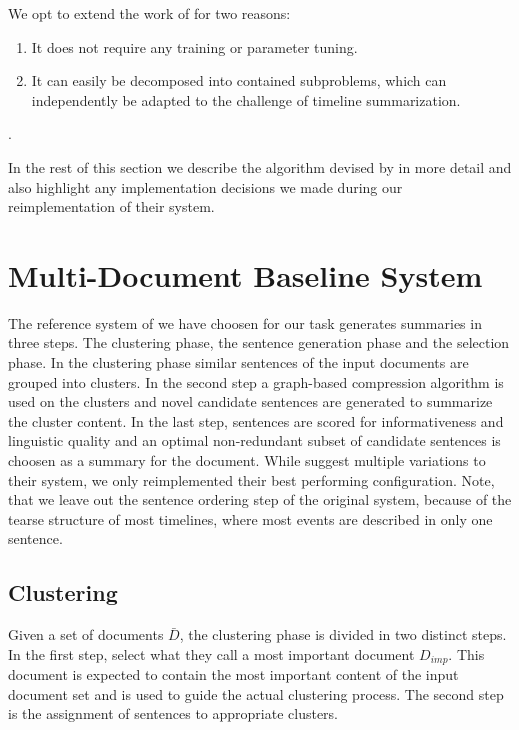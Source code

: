 \documentclass[a4paper,BCOR=10mm]{report}
\numberwithin{lemma}{chapter}
\numberwithin{definition}{chapter}
\begin{document}
We opt to extend the work of \citep{banerjee} for two reasons:

\begin{enumerate}
\item{It does not require any training or parameter tuning.}
\item{It can easily be decomposed into contained subproblems, which can independently be adapted to the challenge of timeline summarization.}
\end{enumerate}.

In the rest of this section we describe the algorithm devised by \citet{banerjee} in more detail and also highlight any implementation decisions we made during our reimplementation of their system.

\section{Multi-Document Baseline System} \label{sec:mds-baseline}

The reference system of \citet{banerjee} we have choosen for our task generates summaries in three steps. The clustering phase, the sentence generation phase and the selection phase. In the clustering phase similar sentences of the input documents are grouped into clusters. In the second step a graph-based compression algorithm is used on the clusters and novel candidate sentences are generated to summarize the cluster content. In the last step, sentences are scored for informativeness and linguistic quality and an optimal non-redundant subset of candidate sentences is choosen as a summary for the document.
While \citeauthor{banerjee} suggest multiple variations to their system, we only reimplemented their best performing configuration. Note, that we leave out the sentence ordering step of the original system, because of the tearse structure of most timelines, where most events are described in only one sentence.

\subsection{Clustering}  \label{sec:baseline-clustering}

Given a set of documents $\bar{D}$, the clustering phase is divided in two distinct steps. In the first step, \citeauthor{banerjee} select what they call a most important document $D_{imp}$. This document is expected to contain the most important content of the input document set and is used to guide the actual clustering process. The second step is the assignment of sentences to appropriate clusters.
\end{document}
